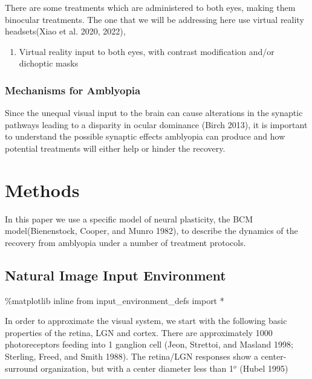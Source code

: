 \documentclass[
  letterpaper,
  DIV=11,
  numbers=noendperiod]{scrreprt}
\newenvironment{Shaded}{\begin{snugshade}}{\end{snugshade}}
\newcommand{\ImportTok}[1]{\textcolor[rgb]{0.00,0.46,0.62}{#1}}
\newcommand{\NormalTok}[1]{\textcolor[rgb]{0.00,0.23,0.31}{#1}}
\newcommand{\OperatorTok}[1]{\textcolor[rgb]{0.37,0.37,0.37}{#1}}
\providecommand{\tightlist}{%
  \setlength{\itemsep}{0pt}\setlength{\parskip}{0pt}}\usepackage{longtable,booktabs,array}
\begin{document}
There are some treatments which are administered to both eyes, making
them binocular treatments. The one that we will be addressing here use
virtual reality headsets(Xiao et al. 2020, 2022),

\begin{enumerate}
\def\labelenumi{\arabic{enumi}.}
\setcounter{enumi}{3}
\tightlist
\item
  Virtual reality input to both eyes, with contrast modification and/or
  dichoptic masks
\end{enumerate}

\hypertarget{mechanisms-for-amblyopia}{%
\section{Mechanisms for Amblyopia}\label{mechanisms-for-amblyopia}}

Since the unequal visual input to the brain can cause alterations in the
synaptic pathways leading to a disparity in ocular dominance (Birch
2013), it is important to understand the possible synaptic effects
amblyopia can produce and how potential treatments will either help or
hinder the recovery.

\part{Methods}

In this paper we use a specific model of neural plasticity, the BCM
model(Bienenstock, Cooper, and Munro 1982), to describe the dynamics of
the recovery from amblyopia under a number of treatment protocols.

\hypertarget{natural-image-input-environment}{%
\chapter{Natural Image Input
Environment}\label{natural-image-input-environment}}

\begin{Shaded}
\begin{Highlighting}[]
\OperatorTok{\%}\NormalTok{matplotlib inline}
\ImportTok{from}\NormalTok{ input\_environment\_defs }\ImportTok{import} \OperatorTok{*}
\end{Highlighting}
\end{Shaded}

In order to approximate the visual system, we start with the following
basic properties of the retina, LGN and cortex. There are approximately
1000 photoreceptors feeding into 1 ganglion cell (Jeon, Strettoi, and
Masland 1998; Sterling, Freed, and Smith 1988). The retina/LGN responses
show a center-surround organization, but with a center diameter less
than 1\(^o\) (Hubel 1995)
\end{document}
